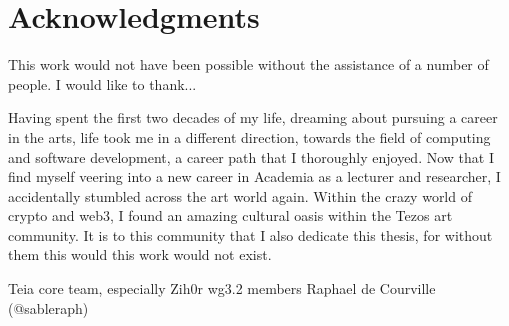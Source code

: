 \chapter*{Acknowledgments}

This work would not have been possible without the assistance of a number of people. I would like to thank...


Having spent the first two decades of my life, dreaming about pursuing a career in the arts, life took me in a different direction, towards the field of computing and software development, a career path that I thoroughly enjoyed. Now that I find myself veering into a new career in Academia as a lecturer and researcher, I accidentally stumbled across the art world again. Within the crazy world of crypto and web3, I found an amazing cultural oasis within the Tezos art community. It is to this community that I also dedicate this thesis, for without them this would this work would not exist. 


Teia core team, especially Zih0r
wg3.2 members
Raphael de Courville (@sableraph)

